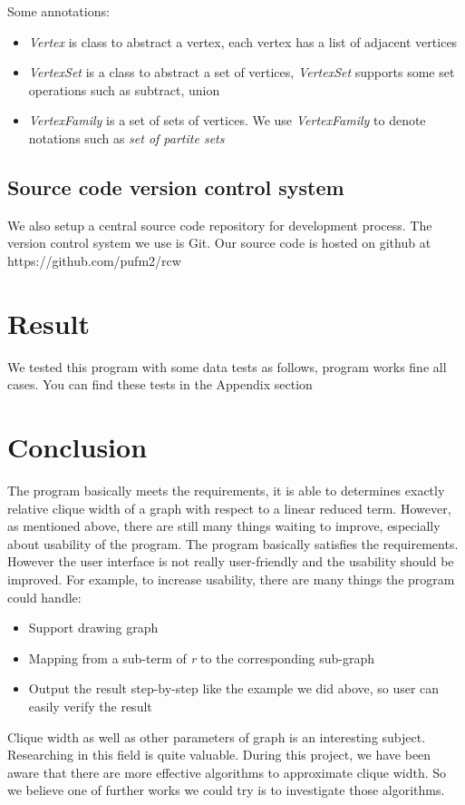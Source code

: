 \documentclass[a4paper, 12pt]{article}
\begin{document}
Some annotations:
\begin{itemize}
\item \textit {Vertex} is class to abstract a vertex, each vertex has a list of adjacent vertices
\item \textit {VertexSet} is a class to abstract a set of vertices, \textit {VertexSet} supports some set operations such as subtract, union
\item \textit {VertexFamily} is a set of sets of vertices. We use \textit {VertexFamily} to denote notations such as \textit {set of partite sets}
\end{itemize}

\subsection{Source code version control system}

We also setup a central source code repository for development process. The version control system we use is Git.\newline
Our source code is hosted on github at https://github.com/pufm2/rcw

\section {Result}
We tested this program with some data tests as follows, program works fine all cases. You can find these tests in the Appendix section


\section {Conclusion}
The program basically meets the requirements, it is able to determines exactly relative clique width of a graph with respect to a linear reduced term. However, as mentioned above, there are still many things waiting to improve, especially about usability of the program.\newline\newline
The program basically satisfies the requirements. However the user interface is not really user-friendly and the usability should be improved. For example, to increase usability, there are many things the program could handle:
\begin{itemize}
\item Support drawing graph 
\item Mapping from a sub-term of \textit {r} to the corresponding sub-graph 
\item Output the result step-by-step like the example we did above, so user
can easily verify the result 
\end{itemize}
Clique width as well as other parameters of graph is an interesting subject. Researching in this field is quite valuable. During this project, we have been aware that there are more effective algorithms to approximate clique width. So we believe one of further works we could try is to investigate those algorithms.
\end{document}
